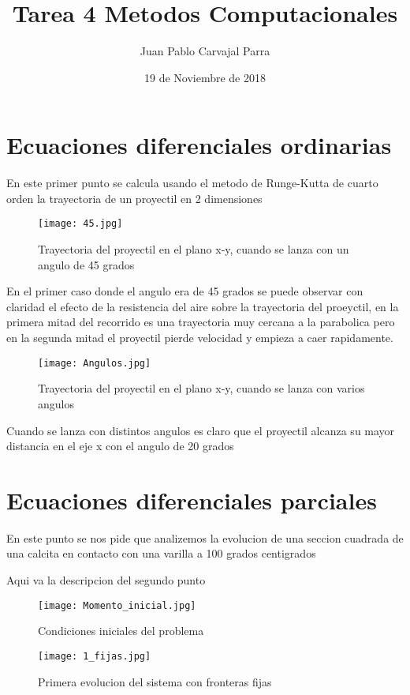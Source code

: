 \documentclass[12pt]{article}
\author{Juan Pablo Carvajal Parra}
\date{19 de Noviembre de 2018}
\title{Tarea 4 Metodos Computacionales}
\begin{document}
\section{Ecuaciones diferenciales ordinarias}

En este primer punto se calcula usando el metodo de Runge-Kutta de cuarto orden la trayectoria de un proyectil en 2 dimensiones  

\begin{figure}[h!]
    \centering
    \texttt{[image: 45.jpg]}
    \caption{Trayectoria del proyectil en el plano x-y, cuando se lanza con un angulo de 45 grados}
    \label{fig1}
\end{figure}

En el primer caso donde el angulo era de 45 grados se puede observar con claridad el efecto de la resistencia del aire sobre la trayectoria del proeyctil, en la primera mitad del recorrido es una trayectoria muy cercana a la parabolica pero en la segunda mitad el proyectil pierde velocidad y empieza a caer rapidamente.

\newpage
\begin{figure}[h!]
    \centering
    \texttt{[image: Angulos.jpg]}
    \caption{Trayectoria del proyectil en el plano x-y, cuando se lanza con varios angulos}
    \label{fig2}
\end{figure}

Cuando se lanza con distintos angulos es claro que el proyectil alcanza su mayor distancia en el eje x con el angulo de 20 grados


\newpage
\section{Ecuaciones diferenciales parciales}

En este punto se nos pide que analizemos la evolucion de una seccion cuadrada de una calcita en contacto con una varilla a 100 grados centigrados 


Aqui va la descripcion del segundo punto


\begin{figure}[h!]
    \centering
    \texttt{[image: Momento\_inicial.jpg]}
    \caption{Condiciones iniciales del problema}
    \label{fig3}
\end{figure}


\begin{figure}[h!]
    \centering
    \texttt{[image: 1\_fijas.jpg]}
    \caption{Primera evolucion del sistema con fronteras fijas}
    \label{fig4}
\end{figure}
\end{document}
